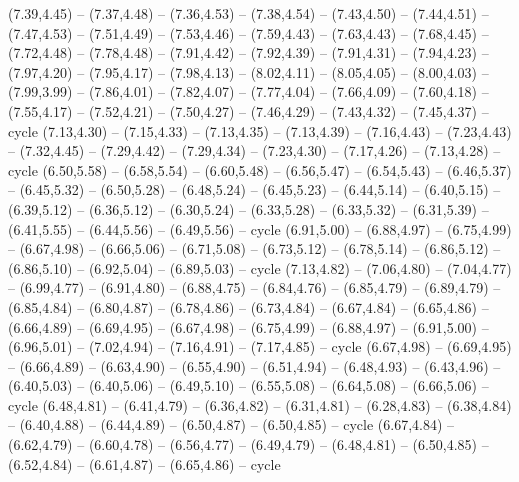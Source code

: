 \expandafter\def\csname geo:gebiet:IRN\endcsname{
  (7.39,4.45) -- (7.37,4.48) -- (7.36,4.53) -- (7.38,4.54) -- (7.43,4.50) -- (7.44,4.51) -- (7.47,4.53) -- (7.51,4.49) -- (7.53,4.46) -- (7.59,4.43) -- (7.63,4.43) -- (7.68,4.45) -- (7.72,4.48) -- (7.78,4.48) -- (7.91,4.42) -- (7.92,4.39) -- (7.91,4.31) -- (7.94,4.23) -- (7.97,4.20) -- (7.95,4.17) -- (7.98,4.13) -- (8.02,4.11) -- (8.05,4.05) -- (8.00,4.03) -- (7.99,3.99) -- (7.86,4.01) -- (7.82,4.07) -- (7.77,4.04) -- (7.66,4.09) -- (7.60,4.18) -- (7.55,4.17) -- (7.52,4.21) -- (7.50,4.27) -- (7.46,4.29) -- (7.43,4.32) -- (7.45,4.37) -- cycle}
\expandafter\def\csname geo:gebiet:SYR\endcsname{
  (7.13,4.30) -- (7.15,4.33) -- (7.13,4.35) -- (7.13,4.39) -- (7.16,4.43) -- (7.23,4.43) -- (7.32,4.45) -- (7.29,4.42) -- (7.29,4.34) -- (7.23,4.30) -- (7.17,4.26) -- (7.13,4.28) -- cycle}
\expandafter\def\csname geo:gebiet:ARM\endcsname{
  }
\expandafter\def\csname geo:gebiet:SWE\endcsname{
  (6.50,5.58) -- (6.58,5.54) -- (6.60,5.48) -- (6.56,5.47) -- (6.54,5.43) -- (6.46,5.37) -- (6.45,5.32) -- (6.50,5.28) -- (6.48,5.24) -- (6.45,5.23) -- (6.44,5.14) -- (6.40,5.15) -- (6.39,5.12) -- (6.36,5.12) -- (6.30,5.24) -- (6.33,5.28) -- (6.33,5.32) -- (6.31,5.39) -- (6.41,5.55) -- (6.44,5.56) -- (6.49,5.56) -- cycle}
\expandafter\def\csname geo:gebiet:BLR\endcsname{
  (6.91,5.00) -- (6.88,4.97) -- (6.75,4.99) -- (6.67,4.98) -- (6.66,5.06) -- (6.71,5.08) -- (6.73,5.12) -- (6.78,5.14) -- (6.86,5.12) -- (6.86,5.10) -- (6.92,5.04) -- (6.89,5.03) -- cycle}
\expandafter\def\csname geo:gebiet:UKR\endcsname{
  (7.13,4.82) -- (7.06,4.80) -- (7.04,4.77) -- (6.99,4.77) -- (6.91,4.80) -- (6.88,4.75) -- (6.84,4.76) -- (6.85,4.79) -- (6.89,4.79) -- (6.85,4.84) -- (6.80,4.87) -- (6.78,4.86) -- (6.73,4.84) -- (6.67,4.84) -- (6.65,4.86) -- (6.66,4.89) -- (6.69,4.95) -- (6.67,4.98) -- (6.75,4.99) -- (6.88,4.97) -- (6.91,5.00) -- (6.96,5.01) -- (7.02,4.94) -- (7.16,4.91) -- (7.17,4.85) -- cycle}
\expandafter\def\csname geo:gebiet:POL\endcsname{
  (6.67,4.98) -- (6.69,4.95) -- (6.66,4.89) -- (6.63,4.90) -- (6.55,4.90) -- (6.51,4.94) -- (6.48,4.93) -- (6.43,4.96) -- (6.40,5.03) -- (6.40,5.06) -- (6.49,5.10) -- (6.55,5.08) -- (6.64,5.08) -- (6.66,5.06) -- cycle}
\expandafter\def\csname geo:gebiet:AUT\endcsname{
  (6.48,4.81) -- (6.41,4.79) -- (6.36,4.82) -- (6.31,4.81) -- (6.28,4.83) -- (6.38,4.84) -- (6.40,4.88) -- (6.44,4.89) -- (6.50,4.87) -- (6.50,4.85) -- cycle}
\expandafter\def\csname geo:gebiet:HUN\endcsname{
  (6.67,4.84) -- (6.62,4.79) -- (6.60,4.78) -- (6.56,4.77) -- (6.49,4.79) -- (6.48,4.81) -- (6.50,4.85) -- (6.52,4.84) -- (6.61,4.87) -- (6.65,4.86) -- cycle}
